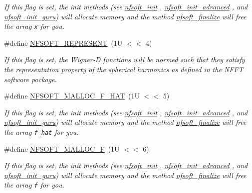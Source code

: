 \begin{CompactItemize}
\begin{CompactList}\small\item\em If this flag is set, the init methods (see \hyperlink{group__nfsoft_g31c884458165fa204073c6c16c10775e}{nfsoft\_\-init} , \hyperlink{group__nfsoft_gf4aec4ee2a2a5d56ca27c4f1a7f90b18}{nfsoft\_\-init\_\-advanced} , and \hyperlink{group__nfsoft_g1c13cdd3f82f48fa41acdd313cdc2052}{nfsoft\_\-init\_\-guru}) will allocate memory and the method \hyperlink{group__nfsoft_g30b5c6ae1ff496680f11ddcaad2d5a47}{nfsoft\_\-finalize} will free the array {\tt x} for you. \item\end{CompactList}\item 
\#define \hyperlink{group__nfsoft_g379d5bf88e399cf492d86090ce47d47d}{NFSOFT\_\-REPRESENT}~(1U $<$$<$ 4)
\begin{CompactList}\small\item\em If this flag is set, the Wigner-D functions will be normed such that they satisfy the representation property of the spherical harmonics as defined in the NFFT software package. \item\end{CompactList}\item 
\#define \hyperlink{group__nfsoft_g846e8298ed59219f7072230bd61c7a2a}{NFSOFT\_\-MALLOC\_\-F\_\-HAT}~(1U $<$$<$ 5)
\begin{CompactList}\small\item\em If this flag is set, the init methods (see \hyperlink{group__nfsoft_g31c884458165fa204073c6c16c10775e}{nfsoft\_\-init} , \hyperlink{group__nfsoft_gf4aec4ee2a2a5d56ca27c4f1a7f90b18}{nfsoft\_\-init\_\-advanced} , and \hyperlink{group__nfsoft_g1c13cdd3f82f48fa41acdd313cdc2052}{nfsoft\_\-init\_\-guru}) will allocate memory and the method \hyperlink{group__nfsoft_g30b5c6ae1ff496680f11ddcaad2d5a47}{nfsoft\_\-finalize} will free the array {\tt f\_\-hat} for you. \item\end{CompactList}\item 
\#define \hyperlink{group__nfsoft_gc65bdc42b4c11296197dc991bbebbd12}{NFSOFT\_\-MALLOC\_\-F}~(1U $<$$<$ 6)
\begin{CompactList}\small\item\em If this flag is set, the init methods (see \hyperlink{group__nfsoft_g31c884458165fa204073c6c16c10775e}{nfsoft\_\-init} , \hyperlink{group__nfsoft_gf4aec4ee2a2a5d56ca27c4f1a7f90b18}{nfsoft\_\-init\_\-advanced} , and \hyperlink{group__nfsoft_g1c13cdd3f82f48fa41acdd313cdc2052}{nfsoft\_\-init\_\-guru}) will allocate memory and the method \hyperlink{group__nfsoft_g30b5c6ae1ff496680f11ddcaad2d5a47}{nfsoft\_\-finalize} will free the array {\tt f} for you. \item\end{CompactList}\item 
$$
\end{CompactItemize}
